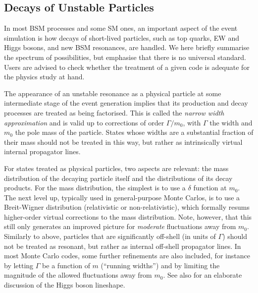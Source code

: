 \subsection{Decays of Unstable Particles \label{sec:decays}}
%
%
In most BSM processes and some SM ones, an important aspect of the
event simulation is how decays of short-lived particles, such as top
quarks, EW and Higgs bosons, and new BSM resonances, are
handled. We here briefly summarise the spectrum of possibilities, but
emphasise that there is no universal standard. Users are advised to check
 whether the treatment of a given code is adequate for the physics
study at hand. 

The appearance of an unstable resonance as a physical particle
at some intermediate stage of the event generation implies that its
production and decay processes are treated as being factorised. 
%
This is called the \emph{narrow width approximation} and is 
valid up to corrections of order $\Gamma/m_0$, with $\Gamma$
the width and $m_0$ the pole mass of the particle. 
States whose widths are a substantial fraction
of their mass should not be treated in this way, but 
rather as intrinsically virtual internal propagator lines. 

For states treated as physical particles, two aspects are relevant:
the mass distribution of the decaying particle itself and the
distributions of its decay products. For the mass distribution, 
the simplest is to use a 
$\delta$ function at $m_0$. The next level up, typically
used in general-purpose Monte Carlos, 
%
is to use a Breit-Wigner distribution (relativistic or
non-relativistic), which formally resums  higher-order virtual corrections to
the mass distribution. Note, however, that this 
still only generates an improved picture for \emph{moderate} fluctuations
away from $m_0$. Similarly to above, particles 
that are significantly off-shell (in units of $\Gamma$) should not be
treated as resonant, but rather as internal off-shell propagator
lines. In most Monte Carlo codes, some further refinements are also 
included, for instance
by letting $\Gamma$ be a function of $m$ (``running widths'') and by
limiting the magnitude of the allowed fluctuations away from
$m_0$. See also \cite{Seymour:1995qg} for an elaborate discussion of the
Higgs boson lineshape. 

